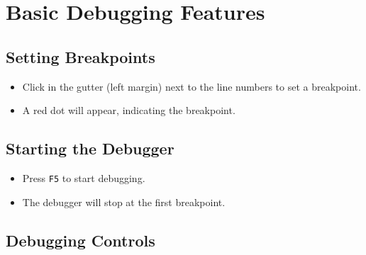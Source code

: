 \documentclass[
  letterpaper,
  DIV=11,
  numbers=noendperiod]{scrreprt}
\newenvironment{Shaded}{\begin{snugshade}}{\end{snugshade}}
\newcommand{\DataTypeTok}[1]{\textcolor[rgb]{0.68,0.00,0.00}{#1}}
\newcommand{\FunctionTok}[1]{\textcolor[rgb]{0.28,0.35,0.67}{#1}}
\newcommand{\OtherTok}[1]{\textcolor[rgb]{0.00,0.23,0.31}{#1}}
\newcommand{\StringTok}[1]{\textcolor[rgb]{0.13,0.47,0.30}{#1}}
\providecommand{\tightlist}{%
  \setlength{\itemsep}{0pt}\setlength{\parskip}{0pt}}\usepackage{longtable,booktabs,array}
\begin{document}
\begin{Shaded}
\end{Shaded}

\section{Basic Debugging Features}\label{basic-debugging-features}

\subsection{Setting Breakpoints}\label{setting-breakpoints}

\begin{itemize}
\tightlist
\item
  Click in the gutter (left margin) next to the line numbers to set a
  breakpoint.
\item
  A red dot will appear, indicating the breakpoint.
\end{itemize}

\subsection{Starting the Debugger}\label{starting-the-debugger}

\begin{itemize}
\tightlist
\item
  Press \texttt{F5} to start debugging.
\item
  The debugger will stop at the first breakpoint.
\end{itemize}

\subsection{Debugging Controls}\label{debugging-controls}
\end{document}
